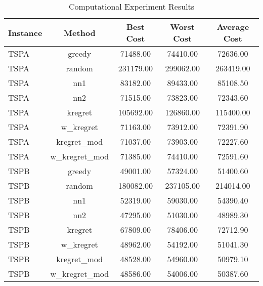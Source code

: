 \begin{table}[ht]
\centering
\caption{Computational Experiment Results}
\label{tab:results}
\begin{tabular}{lcccc}
\hline
Instance & Method & Best Cost & Worst Cost & Average Cost \\
\hline
TSPA & greedy & 71488.00 & 74410.00 & 72636.00 \\
TSPA & random & 231179.00 & 299062.00 & 263419.00 \\
TSPA & nn1 & 83182.00 & 89433.00 & 85108.50 \\
TSPA & nn2 & 71515.00 & 73823.00 & 72343.60 \\
TSPA & kregret & 105692.00 & 126860.00 & 115400.00 \\
TSPA & w\_kregret & 71163.00 & 73912.00 & 72391.90 \\
TSPA & kregret\_mod & 71037.00 & 73903.00 & 72227.60 \\
TSPA & w\_kregret\_mod & 71385.00 & 74410.00 & 72591.60 \\
TSPB & greedy & 49001.00 & 57324.00 & 51400.60 \\
TSPB & random & 180082.00 & 237105.00 & 214014.00 \\
TSPB & nn1 & 52319.00 & 59030.00 & 54390.40 \\
TSPB & nn2 & 47295.00 & 51030.00 & 48989.30 \\
TSPB & kregret & 67809.00 & 78406.00 & 72712.90 \\
TSPB & w\_kregret & 48962.00 & 54192.00 & 51041.30 \\
TSPB & kregret\_mod & 48528.00 & 54960.00 & 50979.10 \\
TSPB & w\_kregret\_mod & 48586.00 & 54006.00 & 50387.60 \\
\hline
\end{tabular}
\end{table}
